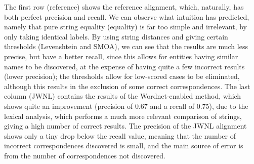 The first row (reference) shows the reference alignment, which, naturally, has both perfect precision and recall. We can observe what intuition has predicted, namely that pure string equality (equality) is far too simple and irrelevant, by only taking identical labels. By using string distances and giving certain thresholds (Levenshtein and SMOA), we can see that the results are much less precise, but have a better recall, since this allows for entities having similar names to be discovered, at the expense of having quite a few incorrect results (lower precision); the thresholds allow for low-scored cases to be eliminated, although this results in the exclusion of some correct correspondences. The last column (JWNL) contains the results of the Wordnet-enabled method, which shows quite an improvement (precision of 0.67 and a recall of 0.75), due to the lexical analysis, which performs a much more relevant comparison of strings, giving a high number of correct results. The precision of the JWNL alignment shows only a tiny drop below the recall value, meaning that the number of incorrect correspondences discovered is small, and the main source of error is from the number of correspondences not discovered.


% 



